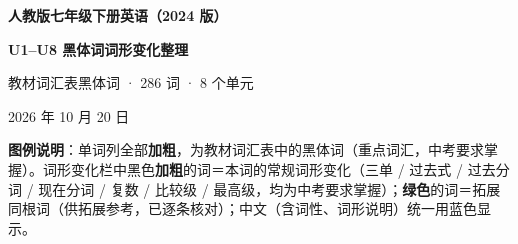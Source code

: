\documentclass[UTF8,a4paper,11pt]{ctexart}
\begin{document}
\begin{center}
{\sffamily\bfseries\fontsize{20pt}{26pt}\selectfont\color{headblue} 人教版七年级下册英语（2024 版）\par}
\vspace{2pt}
{\sffamily\bfseries\fontsize{17pt}{22pt}\selectfont\color{headblue} U1--U8 黑体词词形变化整理\par}
\vspace{7pt}
{\small\color{textgray} 教材词汇表黑体词 · 286 词 · 8 个单元\par}
\vspace{2pt}
{\scriptsize\color{textgray} 2026 年 10 月 20 日\par}
\end{center}
\vspace{2pt}

{\small\color{textgray}\textbf{图例说明}：单词列全部\textbf{加粗}，为教材词汇表中的黑体词（重点词汇，中考要求掌握）。词形变化栏中黑色\textbf{加粗}的词＝本词的常规词形变化（三单 / 过去式 / 过去分词 / 现在分词 / 复数 / 比较级 / 最高级，均为中考要求掌握）；\textbf{\color{cngreen}绿色}的词＝拓展同根词（供拓展参考，已逐条核对）；中文（含词性、词形说明）统一用蓝色显示。}

\vspace{4pt}
\end{document}

